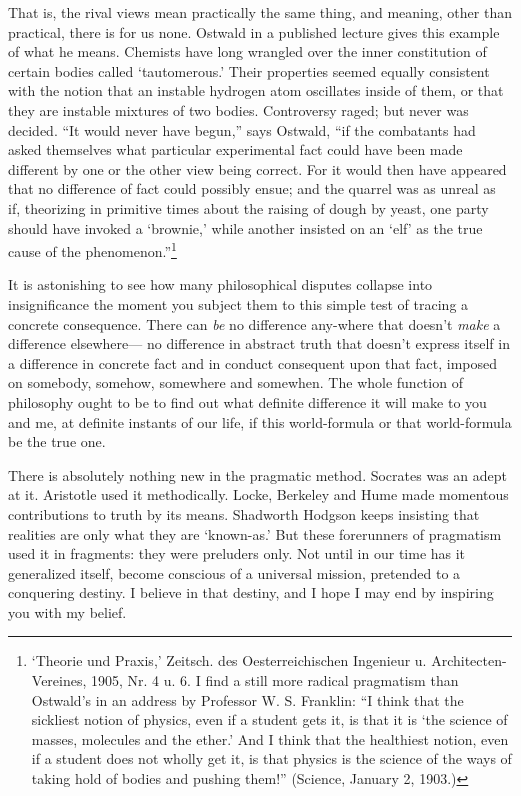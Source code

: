\documentclass[]{article}
\begin{document}
That is, the rival views mean practically the same thing, and meaning,
other than practical, there is for us none. Ostwald in a published
lecture gives this example of what he means. Chemists have long wrangled
over the inner constitution of certain bodies called `tautomerous.'
Their properties seemed equally consistent with the notion that an
instable hydrogen atom oscillates inside of them, or that they are
instable mixtures of two bodies. Controversy raged; but never was
decided. ``It would never have begun,'' says Ostwald, ``if the combatants
had asked themselves what particular experimental fact could have been
made different by one or the other view being correct. For it would then
have appeared that no difference of fact could possibly ensue; and the
quarrel was as unreal as if, theorizing in primitive times about the
raising of dough by yeast, one party should have invoked a `brownie,'
while another insisted on an `elf' as the true cause of the phenomenon.''\footnote{`Theorie und Praxis,' Zeitsch. des Oesterreichischen
Ingenieur u. Architecten-Vereines, 1905, Nr. 4 u. 6. I find a still
more radical pragmatism than Ostwald's in an address by Professor W.
S. Franklin: ``I think that the sickliest notion of physics, even if a
student gets it, is that it is `the science of masses, molecules and the
ether.' And I think that the healthiest notion, even if a student does
not wholly get it, is that physics is the science of the ways of taking
hold of bodies and pushing them!'' (Science, January 2, 1903.)}

It is astonishing to see how many philosophical disputes collapse
into insignificance the moment you subject them to this simple test of
tracing a concrete consequence. There can \emph{be} no difference any-where
that doesn't \emph{make} a difference elsewhere--- no difference in abstract
truth that doesn't express itself in a difference in concrete fact and
in conduct consequent upon that fact, imposed on somebody, somehow,
somewhere and somewhen. The whole function of philosophy ought to be
to find out what definite difference it will make to you and me,
at definite instants of our life, if this world-formula or that
world-formula be the true one.

There is absolutely nothing new in the pragmatic method. Socrates was
an adept at it. Aristotle used it methodically. Locke, Berkeley and Hume
made momentous contributions to truth by its means. Shadworth Hodgson
keeps insisting that realities are only what they are `known-as.'
But these forerunners of pragmatism used it in fragments: they were
preluders only. Not until in our time has it generalized itself, become
conscious of a universal mission, pretended to a conquering destiny. I
believe in that destiny, and I hope I may end by inspiring you with my
belief.
\end{document}
